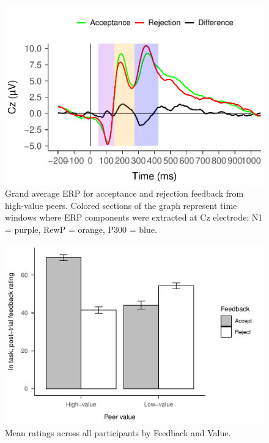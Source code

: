 \documentclass[
  man,floatsintext]{apa7}
\begin{document}
\begin{figure}
\centering
\includegraphics{BUDS_tables_and_figures_working_files/figure-latex/unnamed-chunk-3-1.pdf}
\caption{\label{fig:unnamed-chunk-3}Grand average ERP for acceptance and rejection feedback from high-value peers. Colored sections of the graph represent time windows where ERP components were extracted at Cz electrode: N1 = purple, RewP = orange, P300 = blue.}
\end{figure}

\begin{figure}
\centering
\includegraphics{BUDS_tables_and_figures_working_files/figure-latex/unnamed-chunk-5-1.pdf}
\caption{\label{fig:unnamed-chunk-5}Mean ratings across all participants by Feedback and Value.}
\end{figure}
\end{document}
